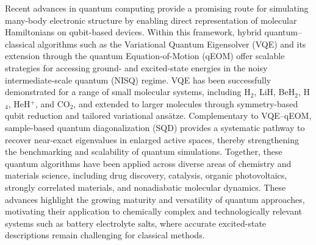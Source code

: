 \documentclass[num-refs]{wiley-article}
\begin{document}

Recent advances in quantum computing provide a promising route for simulating many-body electronic structure by enabling direct representation of molecular Hamiltonians on qubit-based devices\cite{patel2025quantum,cao2019quantum}. Within this framework, hybrid quantum--classical algorithms such as the Variational Quantum Eigensolver (VQE)\cite{peruzzo2014variational,boyn2021quantum,mcclean2016theory} and its extension through the quantum Equation-of-Motion (qEOM)\cite{zheng2024quantum,hlatshwayo2024quantum} offer scalable strategies for accessing ground- and excited-state energies in the noisy intermediate-scale quantum (NISQ) regime\cite{ollitrault2020quantum,de2023complete,bharti2022noisy,acampora2023d}. VQE has been successfully demonstrated for a range of small molecular systems, including H$_2$, LiH, BeH$_2$, H$_4$, HeH$^+$, and CO$_2$\cite{peruzzo2014variational,mcclean2016theory,o2016scalable,ghosh2023deep,tao2022exploring,lotstedt2022evaluation,bauer2020quantum}, and extended to larger molecules through symmetry-based qubit reduction and tailored variational ans\"atze\cite{cao2019quantum}. Complementary to VQE--qEOM, sample-based quantum diagonalization (SQD)\cite{robledo2025chemistry,yu2025quantum,kanno2023quantum,sugisaki2024hamiltonian} provides a systematic pathway to recover near-exact eigenvalues in enlarged active spaces, thereby strengthening the benchmarking and scalability of quantum simulations. Together, these quantum algorithms have been applied across diverse areas of chemistry and materials science, including drug discovery, catalysis, organic photovoltaics, strongly correlated materials, and nonadiabatic molecular dynamics\cite{bauer2020quantum,blunt2022perspective,cava2021introduction,delgado2025quantum,hariharan2024modeling,lipka2024catalysis,motta2020quantum,ollitrault2020nonadiabatic,miessen2021quantum}. These advances highlight the growing maturity and versatility of quantum approaches, motivating their application to chemically complex and technologically relevant systems such as battery electrolyte salts, where accurate excited-state descriptions remain challenging for classical methods.
\end{document}
